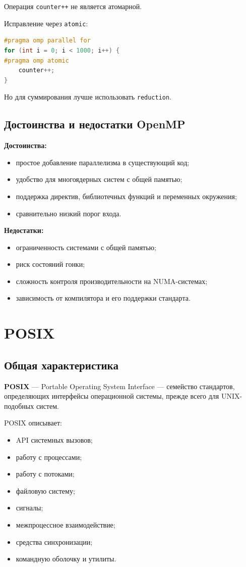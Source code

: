 \documentclass[12pt,a4paper]{article}
\begin{document}
Операция \texttt{counter++} не является атомарной.

Исправление через \texttt{atomic}:

\begin{lstlisting}[language=C]
#pragma omp parallel for
for (int i = 0; i < 1000; i++) {
#pragma omp atomic
    counter++;
}
\end{lstlisting}

Но для суммирования лучше использовать \texttt{reduction}.

\subsection{Достоинства и недостатки OpenMP}

\textbf{Достоинства:}
\begin{itemize}
    \item простое добавление параллелизма в существующий код;
    \item удобство для многоядерных систем с общей памятью;
    \item поддержка директив, библиотечных функций и переменных окружения;
    \item сравнительно низкий порог входа.
\end{itemize}

\textbf{Недостатки:}
\begin{itemize}
    \item ограниченность системами с общей памятью;
    \item риск состояний гонки;
    \item сложность контроля производительности на NUMA-системах;
    \item зависимость от компилятора и его поддержки стандарта.
\end{itemize}

\section{POSIX}

\subsection{Общая характеристика}

\textbf{POSIX} --- Portable Operating System Interface --- семейство стандартов, определяющих интерфейсы операционной системы, прежде всего для UNIX-подобных систем.

POSIX описывает:
\begin{itemize}
    \item API системных вызовов;
    \item работу с процессами;
    \item работу с потоками;
    \item файловую систему;
    \item сигналы;
    \item межпроцессное взаимодействие;
    \item средства синхронизации;
    \item командную оболочку и утилиты.
\end{itemize}
\end{document}

